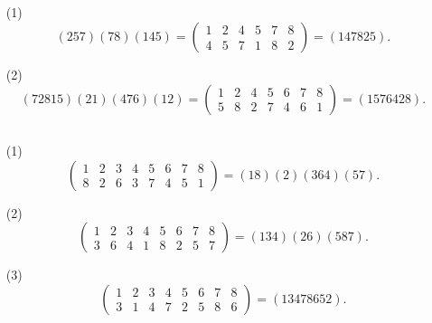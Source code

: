 \documentclass[UTF8]{ctexart}
\begin{document}
\subsection{}   %
\begin{enumerate}
    \item [(1)]
    \[
        (257)(78)(145)
        =
        \begin{pmatrix}
            1 & 2 & 4 & 5 & 7 & 8\\
            4 & 5 & 7 & 1 & 8 & 2
        \end{pmatrix}  
        =
        (147825).
    \]
    \item [(2)]
    \[
        (72815)(21)(476)(12)
        =
        \begin{pmatrix}
            1 & 2 & 4 & 5 & 6 & 7 & 8\\
            5 & 8 & 2 & 7 & 4 & 6 & 1
        \end{pmatrix}  
        =
        (1576428).
    \]
\end{enumerate}

\subsection{}   %
\begin{enumerate}
    \item [(1)]
    \[
        \begin{pmatrix}
            1 & 2 & 3 & 4 & 5 & 6 & 7 & 8\\
            8 & 2 & 6 & 3 & 7 & 4 & 5 & 1
        \end{pmatrix}
        =
        (18)(2)(364)(57). 
    \]
    \item [(2)]
    \[
        \begin{pmatrix}
            1 & 2 & 3 & 4 & 5 & 6 & 7 & 8\\
            3 & 6 & 4 & 1 & 8 & 2 & 5 & 7
        \end{pmatrix}  
        =(134)(26)(587).  
    \]
    \item [(3)]
    \[
        \begin{pmatrix}
            1 & 2 & 3 & 4 & 5 & 6 & 7 & 8\\
            3 & 1 & 4 & 7 & 2 & 5 & 8 & 6
        \end{pmatrix}
        =(13478652). 
    \]
\end{enumerate}
\end{document}
